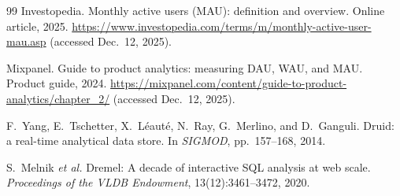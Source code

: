 \documentclass[11pt]{article}
\begin{document}
\begin{thebibliography}{99}
Investopedia.
Monthly active users (MAU): definition and overview.
Online article, 2025. \url{https://www.investopedia.com/terms/m/monthly-active-user-mau.asp} (accessed Dec.\ 12, 2025).

Mixpanel.
Guide to product analytics: measuring DAU, WAU, and MAU.
Product guide, 2024. \url{https://mixpanel.com/content/guide-to-product-analytics/chapter_2/} (accessed Dec.\ 12, 2025).

F.~Yang, E.~Tschetter, X.~L\'eaut\'e, N.~Ray, G.~Merlino, and D.~Ganguli.
Druid: a real-time analytical data store.
In \textit{SIGMOD}, pp.~157--168, 2014.

S.~Melnik \textit{et al.}
Dremel: A decade of interactive SQL analysis at web scale.
\textit{Proceedings of the VLDB Endowment}, 13(12):3461--3472, 2020.

\end{thebibliography}
\end{document}
